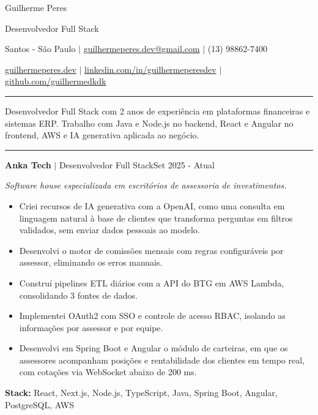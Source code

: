 \documentclass[letterpaper,10pt]{article}
\newcommand{\cvsection}[1]{%
  \vspace{9pt}{\large\bfseries #1}\par\vspace{-5pt}%
  \rule{\linewidth}{0.4pt}\par\vspace{1pt}}
\newcommand{\cvheading}[3]{\textbf{#1} $|$ #2\hfill #3\par}
\newenvironment{cvitems}
  {\begin{itemize}[leftmargin=0.16in,label={},itemsep=1.5pt,topsep=2pt,parsep=0pt]}
  {\end{itemize}}
\newcommand{\cvstack}[2]{\vspace{2pt}\textbf{#1:} #2\par}
\begin{document}
\begin{center}
  {\fontsize{25}{29}\selectfont Guilherme Peres}\par\vspace{3pt}
  {\large Desenvolvedor Full Stack}\par\vspace{5pt}
  Santos - São Paulo $|$
  \href{mailto:guilhermeperes.dev@gmail.com}{guilhermeperes.dev@gmail.com} $|$
  (13) 98862-7400\par\vspace{2pt}
  {\small\color{black!60}%
  \href{https://guilhermeperes.dev/pt}{guilhermeperes.dev} $|$
  \href{https://linkedin.com/in/guilhermeperesdev}{linkedin.com/in/guilhermeperesdev} $|$
  \href{https://github.com/guilhermedkdk}{github.com/guilhermedkdk}}
\end{center}

\cvsection{Perfil}
Desenvolvedor Full Stack com 2 anos de experiência em plataformas financeiras e sistemas ERP.
Trabalho com Java e Node.js no backend, React e Angular no frontend, AWS e IA generativa
aplicada ao negócio.

\cvsection{Experiência Profissional}
\cvheading{Anka Tech}{Desenvolvedor Full Stack}{Set 2025 - Atual}
\textit{Software house especializada em escritórios de assessoria de investimentos.}\par
\begin{cvitems}
  \item Criei recursos de IA generativa com a OpenAI, como uma consulta em linguagem natural à
        base de clientes que transforma perguntas em filtros validados, sem enviar dados
        pessoais ao modelo.
  \item Desenvolvi o motor de comissões mensais com regras configuráveis por assessor, eliminando
        os erros manuais.
  \item Construí pipelines ETL diários com a API do BTG em AWS Lambda, consolidando 3 fontes de dados.
  \item Implementei OAuth2 com SSO e controle de acesso RBAC, isolando as informações por
        assessor e por equipe.
  \item Desenvolvi em Spring Boot e Angular o módulo de carteiras, em que os assessores acompanham
        posições e rentabilidade dos clientes em tempo real, com cotações via WebSocket abaixo de 200 ms.
\end{cvitems}
\cvstack{Stack}{React, Next.js, Node.js, TypeScript, Java, Spring Boot, Angular, PostgreSQL, AWS}
\end{document}

